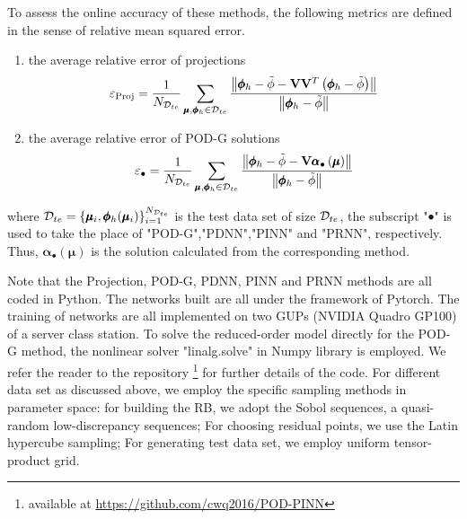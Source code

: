\documentclass[preprint, 10pt]{elsarticle}
\begin{document}
To assess the online accuracy of these methods, the following metrics are defined in the sense of relative mean squared error.
\begin{enumerate}[(1)]
\item the average relative error of  projections
\begin{equation}
\varepsilon_{\rm{Proj}}
=\frac{1}{N_{{\cal D}_{te}}}
\sum\limits_{\pmb\mu ,\pmb{\phi}_h  \in {{\cal D}_{te}}}{
\frac{\left\| \pmb{\phi}_h - \tilde{\phi} -\mathbf{V}\mathbf{V}^T \left( \pmb{\phi}_h - \tilde{\phi} \right)  \right\|}
{\left\| \pmb{\phi}_h  - \tilde{\phi} \right\|}
}
\end{equation}

\item the average relative error of POD-G solutions
\begin{equation}
\varepsilon_{\bullet}
=\frac{1}{N_{{\cal D}_{te}}}
\sum\limits_{\pmb\mu ,\pmb{\phi}_h  \in {{\cal D}_{te}}}{
\frac{\left\| \pmb{\phi}_h- \tilde{\phi}-\mathbf{V}\pmb{\alpha}_{\bullet}\left( \pmb{\mu}\right)
\right\|}
{\left\| \pmb{\phi}_h - \tilde{\phi} \right\|}
}
\end{equation}

\end{enumerate}
where ${{\cal D}_{te}}=\{\pmb{\mu}_i, \pmb{\phi}_h(\pmb{\mu}_i)\}_{i=1}^{N_{{\cal D}_{te}}}$ is the test data set of size ${{\cal D}_{te}}$, the subscript "$\bullet$" is used to take the place of "POD-G","PDNN","PINN" and "PRNN", respectively. Thus, $\pmb{\alpha}_{\bullet}\left( \pmb{\mu}\right)$ is the solution calculated from the corresponding method.

Note that the Projection, POD-G, PDNN, PINN and PRNN methods are all coded in Python. The networks built are all under the framework of Pytorch. The training of networks are all  implemented on two GUPs (NVIDIA Quadro GP100) of a server class station. To solve the reduced-order model directly for the POD-G method, the nonlinear solver "linalg.solve" in  Numpy library is employed. We refer the reader to the repository \footnote{available at \url{https://github.com/cwq2016/POD-PINN}} for further details of the code. For different data set as discussed above, we employ the specific sampling methods in parameter space: for building the RB, we adopt the Sobol sequences, a quasi-random low-discrepancy sequences; For choosing residual points, we use the Latin hypercube sampling; For generating test data set, we employ uniform tensor-product grid.
\end{document}
